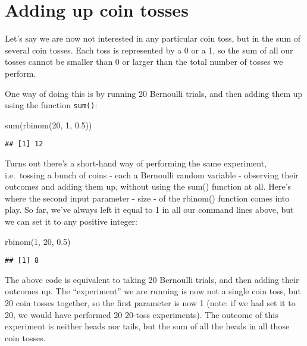 \documentclass[
]{book}
\newenvironment{Shaded}{\begin{snugshade}}{\end{snugshade}}
\newcommand{\DecValTok}[1]{\textcolor[rgb]{0.00,0.00,0.81}{#1}}
\newcommand{\FloatTok}[1]{\textcolor[rgb]{0.00,0.00,0.81}{#1}}
\newcommand{\FunctionTok}[1]{\textcolor[rgb]{0.00,0.00,0.00}{#1}}
\newcommand{\NormalTok}[1]{#1}
\begin{document}
\hypertarget{adding-up-coin-tosses}{%
\section{Adding up coin tosses}\label{adding-up-coin-tosses}}

Let's say we are now not interested in any particular coin toss, but in the sum of several coin tosses. Each toss is represented by a 0 or a 1, so the sum of all our tosses cannot be smaller than 0 or larger than the total number of tosses we perform.

One way of doing this is by running 20 Bernoulli trials, and then adding them up using the function \texttt{sum()}:

\begin{Shaded}
\begin{Highlighting}[]
\FunctionTok{sum}\NormalTok{(}\FunctionTok{rbinom}\NormalTok{(}\DecValTok{20}\NormalTok{, }\DecValTok{1}\NormalTok{, }\FloatTok{0.5}\NormalTok{))}
\end{Highlighting}
\end{Shaded}

\begin{verbatim}
## [1] 12
\end{verbatim}

Turns out there's a short-hand way of performing the same experiment, i.e.~tossing a bunch of coins - each a Bernoulli random variable - observing their outcomes and adding them up, without using the sum() function at all. Here's where the second input parameter - size - of the rbinom() function comes into play. So far, we've always left it equal to 1 in all our command lines above, but we can set it to any positive integer:

\begin{Shaded}
\begin{Highlighting}[]
\FunctionTok{rbinom}\NormalTok{(}\DecValTok{1}\NormalTok{, }\DecValTok{20}\NormalTok{, }\FloatTok{0.5}\NormalTok{)}
\end{Highlighting}
\end{Shaded}

\begin{verbatim}
## [1] 8
\end{verbatim}

The above code is equivalent to taking 20 Bernoulli trials, and then adding their outcomes up. The ``experiment'' we are running is now not a single coin toss, but 20 coin tosses together, so the first parameter is now 1 (note: if we had set it to 20, we would have performed 20 20-toss experiments). The outcome of this experiment is neither heads nor tails, but the sum of all the heads in all those coin tosses.
\end{document}

